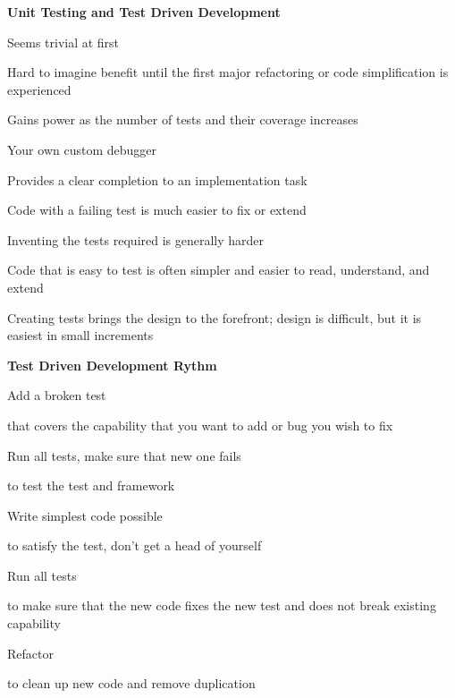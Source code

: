 \documentclass[landscape]{slides}
\renewcommand{\title}[1]{{\large\bfseries #1}}
\newenvironment{itemiz}%
  {\begin{list}{}{\raggedright
      \setlength{\itemsep}{2pt}%
      \setlength{\parskip}{4pt}\setlength{\parsep}{2pt}}}%
  {\end{list}}%
\begin{document}
 \begin{slide}
   \title{ Unit Testing and Test Driven Development}
   \begin{itemiz}
   \item Seems trivial at first
   \item Hard to imagine benefit until the first major refactoring or
     code simplification is experienced
   \item Gains power as the number of tests and their coverage increases
   \item Your own custom debugger
   \item Provides a clear completion to an implementation task
   \item Code with a failing test is much easier to fix or extend
   \item Inventing the tests required is generally harder
   \item Code that is easy to test is often simpler and easier to
   read, understand, and extend
   \item Creating tests brings the design to the forefront; design is
   difficult, but it is easiest in small increments
   \end{itemiz}
 \end{slide}

 \begin{slide}
   \title{Test Driven Development Rythm}
   \begin{itemiz}
   \item Add a broken test
     \begin{itemiz}
     \item that covers the capability that you want to add or bug you wish to fix
     \end{itemiz}
   \item Run all tests, make sure that new one fails
     \begin{itemiz}
     \item to test the test and framework
     \end{itemiz}
   \item Write simplest code possible
     \begin{itemiz}
     \item to satisfy the test, don't get a head of yourself
     \end{itemiz}
   \item Run all tests
     \begin{itemiz}
     \item to make sure that the new code fixes the new test and does not break
  existing capability
     \end{itemiz}
   \item Refactor
     \begin{itemiz}
     \item to clean up new code and remove duplication
     \end{itemiz}
   \end{itemiz}
 \end{slide}
 
\end{document}
